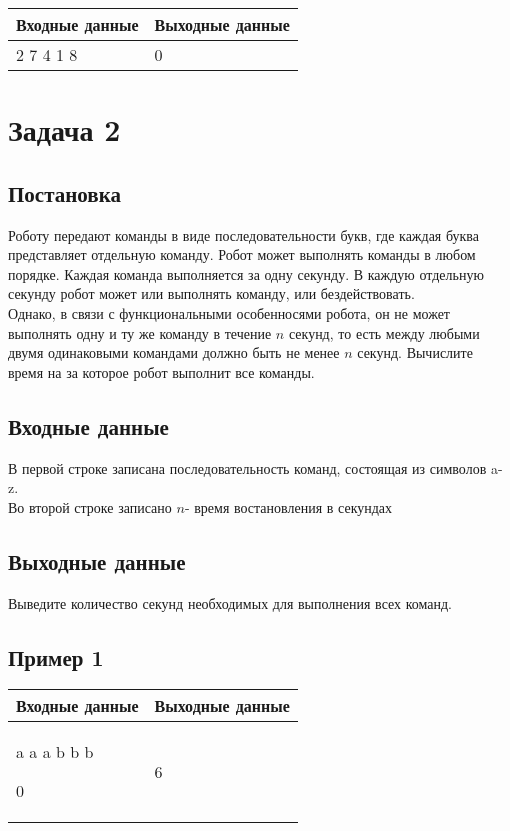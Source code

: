\documentclass[a4]{article}
\begin{document}
\begin{table}[H]
\begin{center}
\begin{tabular}{|m{4cm}|m{4cm}|}
\hline
Входные данные & Выходные данные \\ \hline
2 7 4 1 8
&
0
\\ \hline
\end{tabular}
\end{center}
\end{table}

\pagebreak
\section*{Задача 2}
\label{sec:orgef181bd}
\subsection*{Постановка}
\label{sec:orgad8a20e}
Роботу передают команды в виде последовательности букв, где каждая буква представляет отдельную команду. Робот может выполнять команды в любом порядке. Каждая команда выполняется за одну секунду. В каждую отдельную секунду робот может или выполнять команду, или бездействовать. \\
Однако, в связи с функциональными особенносями робота, он не может выполнять одну и ту же команду в течение \(n\) секунд, то есть между любыми двумя одинаковыми командами должно быть не менее \(n\) секунд.
Вычислите время на за которое робот выполнит все команды.

\subsection*{Входные данные}
\label{sec:orgc51833b}
В первой строке записана последовательность команд, состоящая из символов a-z.\\
Во второй строке записано \(n\)- время востановления в секундах
\subsection*{Выходные данные}
\label{sec:orgf9da829}
Выведите количество секунд необходимых для выполнения всех команд.

\subsection*{Пример 1}
\label{sec:orgd7d348d}

\begin{table}[H]
\begin{center}
\begin{tabular}{|m{4cm}|m{4cm}|}
\hline
Входные данные & Выходные данные \\ \hline
a a a b b b 

0
&
6
\\ \hline
\end{tabular}
\end{center}
\end{table}
\end{document}
